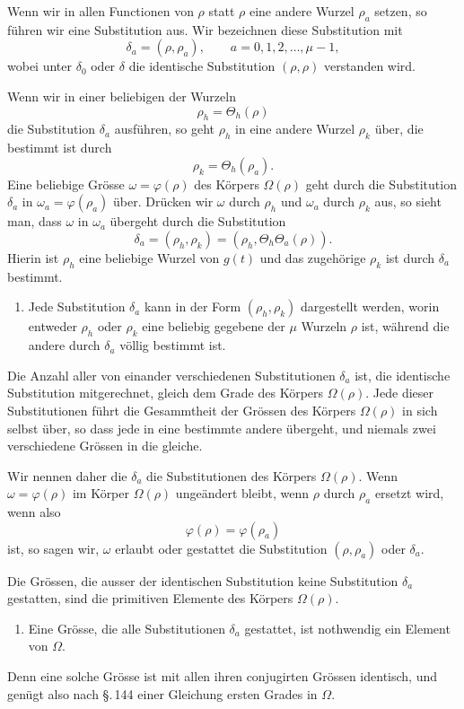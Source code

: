 \documentclass[11pt]{article}
\begin{document}
Wenn wir in allen Functionen von $\rho$ statt $\rho$ eine andere Wurzel $\rho_a$ setzen, so führen wir eine Substitution aus. Wir bezeichnen diese Substitution mit
\[
        \delta_a=(\rho,\rho_a),\qquad a=0,1,2,\ldots,\mu-1,
\]
wobei unter $\delta_0$ oder $\delta$ die identische Substitution $(\rho,\rho)$ verstanden wird.

Wenn wir in einer beliebigen der Wurzeln
\[
        \rho_h=\Theta_h(\rho)
\]
die Substitution $\delta_a$ ausführen, so geht $\rho_h$ in eine andere Wurzel $\rho_k$ über, die bestimmt ist durch
\[
        \rho_k=\Theta_h(\rho_a).
\]
Eine beliebige Grösse $\omega=\varphi(\rho)$ des Körpers $\Omega(\rho)$ geht durch die Substitution $\delta_a$ in $\omega_a=\varphi(\rho_a)$ über. Drücken wir $\omega$ durch $\rho_h$ und $\omega_a$ durch $\rho_k$ aus, so sieht man, dass $\omega$ in $\omega_a$ übergeht durch die Substitution
\[
\tag{9}
        \delta_a=(\rho_h,\rho_k)=(\rho_h,\Theta_h\Theta_a(\rho)).
\]
Hierin ist $\rho_h$ eine beliebige Wurzel von $g(t)$ und das zugehörige $\rho_k$ ist durch $\delta_a$ bestimmt.

\begin{enumerate}[label=\arabic*.,leftmargin=2em,start=3]
\item Jede Substitution $\delta_a$ kann in der Form $(\rho_h,\rho_k)$ dargestellt werden, worin entweder $\rho_h$ oder $\rho_k$ eine beliebig gegebene der $\mu$ Wurzeln $\rho$ ist, während die andere durch $\delta_a$ völlig bestimmt ist.
\end{enumerate}

Die Anzahl aller von einander verschiedenen Substitutionen $\delta_a$ ist, die identische Substitution mitgerechnet, gleich dem Grade des Körpers $\Omega(\rho)$. Jede dieser Substitutionen führt die Gesammtheit der Grössen des Körpers $\Omega(\rho)$ in sich selbst über, so dass jede in eine bestimmte andere übergeht, und niemals zwei verschiedene Grössen in die gleiche.

Wir nennen daher die $\delta_a$ die Substitutionen des Körpers $\Omega(\rho)$. Wenn $\omega=\varphi(\rho)$ im Körper $\Omega(\rho)$ ungeändert bleibt, wenn $\rho$ durch $\rho_a$ ersetzt wird, wenn also
\[
        \varphi(\rho)=\varphi(\rho_a)
\]
ist, so sagen wir, $\omega$ erlaubt oder gestattet die Substitution $(\rho,\rho_a)$ oder $\delta_a$.

Die Grössen, die ausser der identischen Substitution keine Substitution $\delta_a$ gestatten, sind die primitiven Elemente des Körpers $\Omega(\rho)$.
\begin{enumerate}[label=\arabic*.,leftmargin=2em,start=4]
\item Eine Grösse, die alle Substitutionen $\delta_a$ gestattet, ist nothwendig ein Element von $\Omega$.
\end{enumerate}
Denn eine solche Grösse ist mit allen ihren conjugirten Grössen identisch, und genügt also nach §.\,144 einer Gleichung ersten Grades in $\Omega$.
\end{document}
